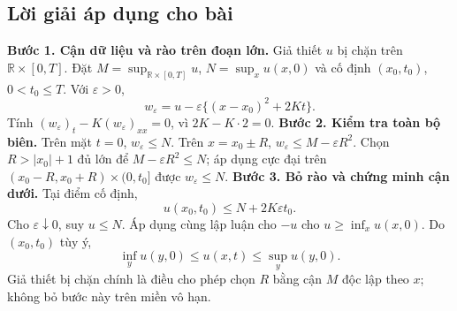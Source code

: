 \documentclass[10pt,a4paper]{article}
\begin{document}
\subsection*{Lời giải áp dụng cho bài}
\textbf{Bước 1. Cận dữ liệu và rào trên đoạn lớn.} Giả thiết $u$ bị chặn trên $\mathbb R\times[0,T]$. Đặt $M=\sup_{\mathbb R\times[0,T]}u$, $N=\sup_xu(x,0)$ và cố định $(x_0,t_0)$, $0<t_0\le T$. Với $\varepsilon>0$,
\[w_\varepsilon=u-\varepsilon\{(x-x_0)^2+2Kt\}.\]
Tính $(w_\varepsilon)_t-K(w_\varepsilon)_{xx}=0$, vì $2K-K\cdot2=0$.
\textbf{Bước 2. Kiểm tra toàn bộ biên.} Trên mặt $t=0$, $w_\varepsilon\le N$. Trên $x=x_0\pm R$, $w_\varepsilon\le M-\varepsilon R^2$. Chọn $R>|x_0|+1$ đủ lớn để $M-\varepsilon R^2\le N$; áp dụng cực đại trên $(x_0-R,x_0+R)\times(0,t_0]$ được $w_\varepsilon\le N$.
\textbf{Bước 3. Bỏ rào và chứng minh cận dưới.} Tại điểm cố định,
\[u(x_0,t_0)\le N+2K\varepsilon t_0.\]
Cho $\varepsilon\downarrow0$, suy $u\le N$. Áp dụng cùng lập luận cho $-u$ cho $u\ge\inf_xu(x,0)$. Do $(x_0,t_0)$ tùy ý,
\[\inf_yu(y,0)\le u(x,t)\le\sup_yu(y,0).\]
Giả thiết bị chặn chính là điều cho phép chọn $R$ bằng cận $M$ độc lập theo $x$; không bỏ bước này trên miền vô hạn.
\end{document}
